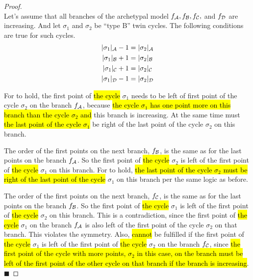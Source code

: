 \begin{proof} \phantom{x} \\
	Let's assume that all branches of the archetypal model $f_{\mathcal{A}}, f_{\mathcal{B}}, f_{\mathcal{C}},$ and $f_{\mathcal{D}}$ are increasing.
	And let $\sigma_1$ and $\sigma_2$ be ``type B'' twin cycles.
	The following conditions are true for such cycles.
	\begin{subequations}
		\begin{align}
			|\sigma_1|_{\mathcal{A}} - 1 & = |\sigma_2|_{\mathcal{A}} \label{equ:add.change.conseq.sigmaA} \\
			|\sigma_1|_{\mathcal{B}} + 1 & = |\sigma_2|_{\mathcal{B}} \label{equ:add.change.conseq.sigmaB} \\
			|\sigma_1|_{\mathcal{C}} + 1 & = |\sigma_2|_{\mathcal{C}} \label{equ:add.change.conseq.sigmaC} \\
			|\sigma_1|_{\mathcal{D}} - 1 & = |\sigma_2|_{\mathcal{D}} \label{equ:add.change.conseq.sigmaD}
		\end{align}
	\end{subequations}

	For  to hold, the first point of \hl{the cycle} $\sigma_1$ needs to be left of first point of the cycle $\sigma_2$ on the branch $f_{\mathcal{A}}$, because \hl{the cycle $\sigma_1$ has one point more on this branch than the cycle $\sigma_2$ and} this branch is increasing.
	At the same time must \hl{the last point of the cycle $\sigma_1$} be right of the last point of the cycle $\sigma_2$ on this branch.

	The order of the first points on the next branch, $f_{\mathcal{B}}$, is the same as for the last points on the branch $f_{\mathcal{A}}$.
	So the first point of \hl{the cycle} $\sigma_2$ is left of the first point of \hl{the cycle} $\sigma_1$ on this branch.
	For  to hold, \hl{the last point of the cycle $\sigma_2$ must be right of the last point of the cycle} $\sigma_1$ on this branch per the same logic as before.

	The order of the first points on the next branch, $f_{\mathcal{C}}$, is the same as for the last points on the branch $f_{\mathcal{B}}$.
	So the first point of \hl{the cycle} $\sigma_1$ is left of the first point of \hl{the cycle} $\sigma_2$ on this branch.
	This is a contradiction, since the first point of \hl{the cycle} $\sigma_1$ on the branch $f_{\mathcal{A}}$ is also left of the first point of the cycle $\sigma_2$ on that branch.
	This violates the symmetry.
	Also,  \hl{cannot} be fulfilled if the first point of \hl{the cycle} $\sigma_1$ is left of the first point of \hl{the cycle} $\sigma_2$ on the branch $f_{\mathcal{C}}$, since \hl{the first point of the cycle with more points, $\sigma_2$ in this case, on the branch must be left of the first point of the other cycle on that branch if the branch is increasing}.
	\hfill $\blacksquare$
\end{proof}
